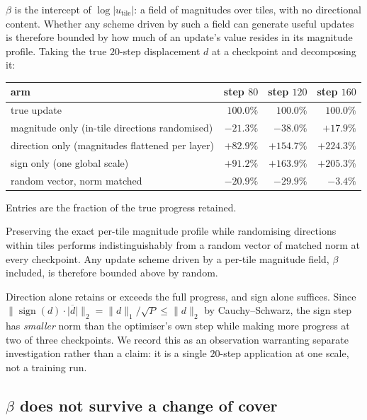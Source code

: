 $\beta$ is the intercept of $\log|u_{\text{tile}}|$: a field of magnitudes over
tiles, with no directional content. Whether any scheme driven by such a field
can generate useful updates is therefore bounded by how much of an update's
value resides in its magnitude profile. Taking the true $20$-step displacement
$d$ at a checkpoint and decomposing it:

\begin{center}
\begin{tabular}{lrrr}
\toprule
arm & step $80$ & step $120$ & step $160$ \\
\midrule
true update                                   & $100.0\%$ & $100.0\%$ & $100.0\%$ \\
magnitude only (in-tile directions randomised) & $-21.3\%$ & $-38.0\%$ & $+17.9\%$ \\
direction only (magnitudes flattened per layer) & $+82.9\%$ & $+154.7\%$ & $+224.3\%$ \\
sign only (one global scale)                   & $+91.2\%$ & $+163.9\%$ & $+205.3\%$ \\
random vector, norm matched                    & $-20.9\%$ & $-29.9\%$ & $-3.4\%$ \\
\bottomrule
\end{tabular}
\end{center}

Entries are the fraction of the true progress retained.

\begin{proposition}
Preserving the exact per-tile magnitude profile while randomising directions
within tiles performs indistinguishably from a random vector of matched norm at
every checkpoint. Any update scheme driven by a per-tile magnitude field,
$\beta$ included, is therefore bounded above by random.
\end{proposition}

Direction alone retains or exceeds the full progress, and sign alone suffices.
Since $\|\operatorname{sign}(d)\cdot\overline{|d|}\|_2 = \|d\|_1/\sqrt{P} \leq
\|d\|_2$ by Cauchy--Schwarz, the sign step has \emph{smaller} norm than the
optimiser's own step while making more progress at two of three checkpoints.
We record this as an observation warranting separate investigation rather than
a claim: it is a single $20$-step application at one scale, not a training run.

\subsection{$\beta$ does not survive a change of cover}
\label{sec:cover-dependence}

